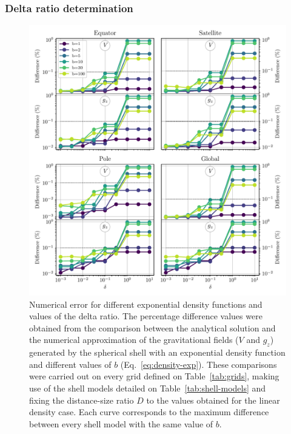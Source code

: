\documentclass[extra, referee]{gji}
\begin{document}
\subsubsection{Delta ratio determination}

\begin{figure}
\centering
\includegraphics[width=\linewidth]{figures/exponential-density-diffs.pdf}
\caption{
    Numerical error for different exponential density functions and values of the delta
    ratio.
    The percentage difference values were obtained from the comparison between the
    analytical solution and the numerical approximation of the gravitational fields ($V$
    and $g_z$) generated by the spherical shell with an exponential density function and
    different values of $b$ (Eq.~\ref{eq:density-exp}).
    These comparisons were carried out on every grid defined on Table~\ref{tab:grids},
    making use of the shell models detailed on Table~\ref{tab:shell-models} and
    fixing the distance-size ratio $D$ to the values obtained for the linear density
    case.
    Each curve corresponds to the maximum difference between every shell model with the
    same value of $b$.
    }
\label{fig:delta-exponential}
\end{figure}
\end{document}
